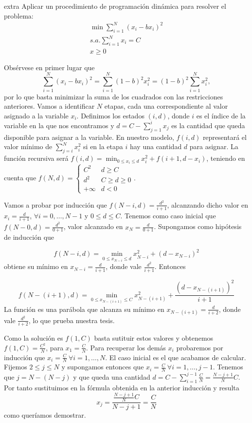 \documentclass[twoside]{article}
\begin{document}
\newpage

\begin{ejercicio}{extra}
Aplicar un procedimiento de programación dinámica para resolver el problema:
\begin{align*}
\min\sum_{i=1}^N (x_i-bx_i)^2\\
s.a. \sum_{i=1}^N x_i=C\\
x\geq 0
\end{align*}
\end{ejercicio}
\begin{solucion}
Obsérvese en primer lugar que $$\sum_{i=1}^N (x_i-bx_i)^2=\sum_{i=1}^N (1-b)^2x_i^2=(1-b)^2\sum_{i=1}^N x_i^2,$$ por lo que basta minimizar la suma de los cuadrados con las restricciones anteriores. Vamos a identificar $N$ etapas, cada una correspondiente al valor asignado a la variable $x_i$. Definimos los estados $(i,d)$, donde $i$ es el índice de la variable en la que nos encontramos y $d=C-\sum_{j=1}^i x_j$ es la cantidad que queda disponible para asignar a la variable. En nuestro modelo, $f(i,d)$ representará el valor mínimo de $\sum_{j=i}^N x_i^2$ si en la etapa $i$ hay una cantidad $d$ para asignar. La función recursiva será $f(i,d)=\min_{0\leq x_i\leq d}  x_i^2+f(i+1,d-x_i)$, teniendo en cuenta que $f(N,d)=\begin{cases}
C^2 & d\geq C\\
d^2 & C\geq d\geq 0\\
+\infty & d<0
\end{cases}$. 

Vamos a probar por inducción que $f(N-i,d)=\frac{d^2}{i+1}$, alcanzando dicho valor en $x_i=\frac{d}{i+1}$, $\forall i=0,\dots, N-1$ y $0\leq d\leq C$. Tenemos como caso inicial que $f(N-0,d)=\frac{d^2}{0+1}$, valor alcanzado en $x_N=\frac{d}{0+1}$. Supongamos como hipótesis de inducción que

$$f(N-i,d)=\min_{0\leq x_{N-i}\leq d}x_{N-i}^2+(d-x_{N-i})^2$$
obtiene su mínimo en $x_{N-i}=\frac{d}{i+1}$, donde vale $\frac{d^2}{i+1}$. Entonces

$$f(N-(i+1),d)=\min_{0\leq x_{N-(i+1)}\leq C}x_{N-(i+1)}^2+\frac{(d-x_{N-(i+1)})^2}{i+1}$$
La función es una parábola que alcanza su mínimo en $x_{N-(i+1)}=\frac{d}{i+2}$, donde vale $\frac{d^2}{i+2}$, lo que prueba nuestra tesis.

Como la solución es $f(1,C)$ basta sutituir estos valores y obtenemos $f(1,C)=\frac{C^2}{N}$, para $x_1=\frac{C}{N}$. Para recuperar los demás $x_i$ probaremos por inducción que $x_i=\frac{C}{N}\ \forall i=1,\dots,N$. El caso inicial es el que acabamos de calcular. Fijemos $2\leq j\leq N$ y supongamos entonces que $x_i=\frac{C}{N}\ \forall i=1,\dots,j-1$. Tenemos que $j=N-(N-j)$ y que queda una cantidad $d=C-\sum_{i=1}^{j-1}\frac{C}{N}=\frac{N-j+1}{N}C$. Por tanto sustituimos en la fórmula obtenida en la anterior inducción y resulta
$$x_j=\frac{\frac{N-j+1}{N}C}{N-j+1}=\frac{C}{N}$$
como queríamos demostrar.
\end{solucion}
\end{document}
